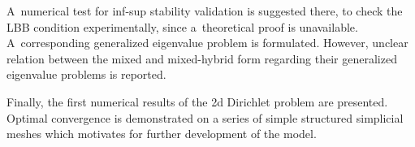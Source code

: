 A~numerical test for inf-sup stability validation is suggested there,
to check the LBB condition experimentally, since a~theoretical proof is unavailable.
A~corresponding generalized eigenvalue problem is formulated.
However, unclear relation between the mixed and mixed-hybrid form regarding
their generalized eigenvalue problems is reported.

Finally, the first numerical results of the 2d Dirichlet problem are presented.
Optimal convergence is demonstrated on a series of simple structured simplicial meshes
which motivates for further development of the model.


